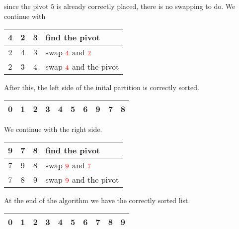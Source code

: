 since the pivot \(5\) is already correctly placed, there is no swapping to do. We continue with

\begin{center}
    \begin{tabular}{ | c | c | c | l | }
        \hline
        4 & 2 & \cellcolor{LightCyan}3 & find the {\color{cyan}pivot} \\ \hline
        \color{red}2 & \color{red}4 & \cellcolor{LightCyan}3 & swap \(\color{red}4\) and \(\color{red}2\) \\ \hline
        2 & \color{cyan}3 & \color{red}4 & swap \(\color{red}4\) and the {\color{cyan}pivot} \\ \hline
    \end{tabular}
\end{center}

After this, the left side of the inital partition is correctly sorted.

\begin{center}
    \begin{tabular}{ | c | c | c | c | c | c || c || c | c | c | }
        \hline
        0 & 1 & 2 & 3 & 4 & 5 & \cellcolor{LightCyan}6 & 9 & 7 & 8 \\ \hline
    \end{tabular}
\end{center}

We continue with the right side.

\begin{center}
    \begin{tabular}{ | c | c | c | l |}
        \hline
        9 & 7 & \cellcolor{LightCyan}8 & find the {\color{cyan}pivot} \\ \hline
        \color{red}7 & \color{red}9 & \cellcolor{LightCyan}8 & swap \(\color{red}9\) and \(\color{red}7\) \\ \hline
        7 & \color{cyan}8 & \color{red}9 & swap \(\color{red}9\) and the {\color{cyan}pivot} \\ \hline
    \end{tabular}
\end{center}

At the end of the algorithm we have the correctly sorted list.

\begin{center}
    \begin{tabular}{ | c | c | c | c | c | c | c | c | c | c | }
        \hline
        0 & 1 & 2 & 3 & 4 & 5 & 6 & 7 & 8 & 9 \\ \hline
    \end{tabular}
\end{center}